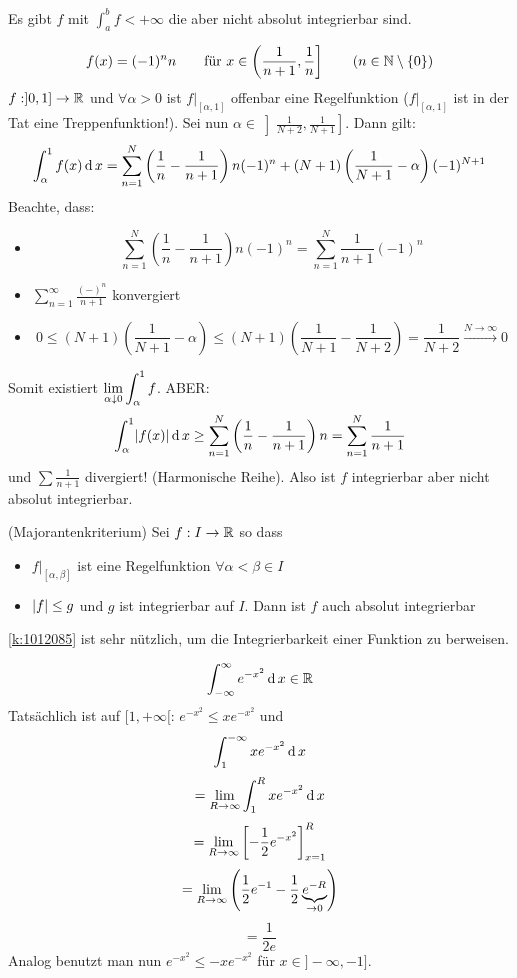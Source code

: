 \begin{Bsp} Es gibt $f$ mit $\int_a^bf < +\infty$ die aber nicht absolut integrierbar sind.
 
\[f(x)=(-1)^nn
\qquad
\mbox{für } x\in\left( \frac{1}{n+1},\frac{1}{n} \right] \qquad (n\in\mathbb{N}\setminus\left\{ 0 \right\})
\]
$f:]0,1]\to\mathbb{R}$ und $\forall \alpha>0$ ist $f|_{[\alpha,1]}$ offenbar 
eine Regelfunktion ($f|_{[\alpha, 1]}$ ist in der Tat eine Treppenfunktion!). 
Sei nun $\alpha\in\left] \frac{1}{N+2},\frac{1}{N+1} \right]$. Dann gilt:
  \[\int_\alpha^1f(x)\operatorname{d} x=\sum^N_{n=1}\left( \frac{1}{n}-\frac{1}{n+1} \right)n(-1)^n+(N+1)\left( \frac{1}{N+1}-\alpha \right)(-1)^{N+1}\]
  Beachte, dass:
  \begin{itemize}
    \item 
      \[\sum^N_{n=1}\left( \frac{1}{n}-\frac{1}{n+1} \right)n(-1)^n=\sum^N_{n=1}\frac{1}{n+1}(-1)^n\]
    \item $\sum^\infty_{n=1}\frac{(-)^n}{n+1}$ konvergiert
    \item 
      \[0\leq (N+1)\left( \frac{1}{N+1}-\alpha \right)\leq(N+1)\left( \frac{1}{N+1}-\frac{1}{N+2} \right)=\frac{1}{N+2}\stackrel{N\to\infty}{\rightarrow}0\]
  \end{itemize}
  Somit existiert $\displaystyle\lim_{\alpha\downarrow 0}\int_\alpha^1f$. ABER:
  \[\int_\alpha^1\mathopen| f(x) \mathclose|\operatorname{d} x\geq \sum^N_{n=1}\left( \frac{1}{n}-\frac{1}{n+1} \right)n=\sum_{n=1}^N\frac{1}{n+1}\]
  und $\sum\frac{1}{n+1}$ divergiert! (Harmonische Reihe). Also ist $f$ integrierbar aber nicht absolut integrierbar.
\end{Bsp}
\begin{Kor}{(Majorantenkriterium)}\label{k:1012085}
  Sei $f:I\to\mathbb{R}$ so dass
  \begin{itemize}
    \item $f|_{[\alpha,\beta]}$ ist eine Regelfunktion $\forall \alpha<\beta\in I$
    \item $\mathopen| f \mathclose|\leq g$ und $g$ ist integrierbar auf $I$. Dann ist $f$ auch absolut integrierbar
  \end{itemize}
\end{Kor}
\begin{Bem}\ref{k:1012085} ist sehr nützlich, um die Integrierbarkeit einer Funktion zu berweisen.
\end{Bem}
\begin{Bsp}
  \[\int_{-\infty}^\infty e^{-x^2}\operatorname{d} x\in\mathbb{R}\]
  Tatsächlich ist auf $[1,+\infty[$: $e^{-x^2}\leq xe^{-x^2}$ und
  \[\int_1^{-\infty}xe^{-x^2}\operatorname{d} x\]
  \[=\displaystyle\lim_{R\rightarrow\infty}\int_1^Rxe^{-x^2}\operatorname{d} x\]
  \[=\displaystyle\lim_{R\rightarrow\infty}\left[ -\frac{1}{2}e^{-x^2} \right]_{x=1}^R\]
  \[=\displaystyle\lim_{R\rightarrow\infty}\left( \frac{1}{2}e^{-1}-\frac{1}{2}\underbrace{e^{-R}}_{\to 0} \right)\]
  \[=\frac{1}{2e}\]
  Analog benutzt man nun $e^{-x^2}\leq -xe^{-x^2}$ für $x\in]-\infty,-1]$.
\end{Bsp}
